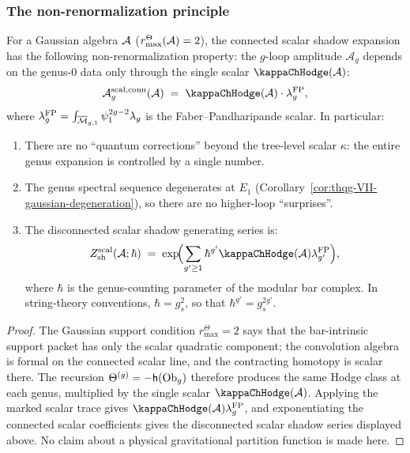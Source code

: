 \subsubsection{The non-renormalization principle}

\begin{theorem}
For a Gaussian algebra $\mathcal{A}$ \textup{(}\(r^\Theta_{\max}(\mathcal{A})=2\)\textup{)},
the connected scalar shadow expansion has the following
non-renormalization property: the $g$-loop amplitude
$\mathcal{A}_g$ depends on the genus-$0$ data only through
the single scalar $\kappaChHodge(\cA)$:
\begin{equation}%
\mathcal{A}_g^{\mathrm{scal,conn}}(\cA)
\;=\;
\kappaChHodge(\cA)\cdot \lambda_g^{\mathrm{FP}},
\end{equation}
where
\(\lambda_g^{\mathrm{FP}}
=\int_{\overline{\mathcal{M}}_{g,1}}\psi_1^{2g-2}\lambda_g\)
is the Faber--Pandharipande scalar.
In particular:
\begin{enumerate}[label=\textup{(\roman*)}]
\item There are no ``quantum corrections'' beyond the
 tree-level scalar $\kappa$: the entire genus expansion is
 controlled by a single number.
\item The genus spectral sequence degenerates at $E_1$
 \textup{(}Corollary~\textup{\ref{cor:thqg-VII-gaussian-degeneration})},
 so there are no higher-loop ``surprises''.
\item The disconnected scalar shadow generating series is:
 \begin{equation}%
 Z_{\mathrm{sh}}^{\mathrm{scal}}(\cA;\hbar)
 \;=\;
 \exp\!\Bigl(\sum_{g' \geq 1} \hbar^{g'}
 \kappaChHodge(\cA)\lambda_{g'}^{\mathrm{FP}}\Bigr),
 \end{equation}
 where $\hbar$ is the genus-counting parameter of the modular
 bar complex. In string-theory conventions, $\hbar = g_s^2$,
 so that $\hbar^{g'} = g_s^{2g'}$.
\end{enumerate}
\end{theorem}

\begin{proof}
The Gaussian support condition \(r^\Theta_{\max}=2\) says that the
bar-intrinsic support packet has only the scalar quadratic component;
the convolution algebra is formal on the connected scalar line, and
the contracting homotopy is scalar there. The recursion
\(\Theta^{(g)}=-\mathsf{h}(\mathrm{Ob}_g)\) therefore produces the same
Hodge class at each genus, multiplied by the single scalar
\(\kappaChHodge(\cA)\). Applying the marked scalar trace gives
\(\kappaChHodge(\cA)\lambda_g^{\mathrm{FP}}\), and exponentiating
the connected scalar coefficients gives the disconnected scalar
shadow series displayed above. No claim about a physical
gravitational partition function is made here.
\end{proof}

